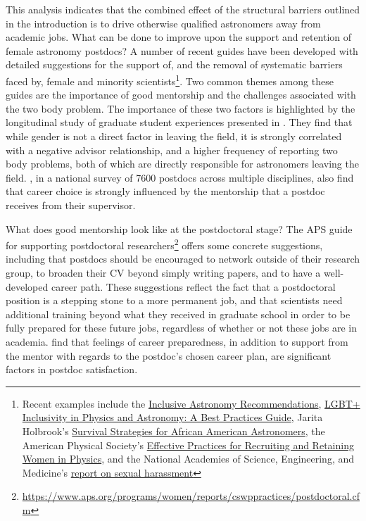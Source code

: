 \documentclass[modern]{aastex62}
\begin{document}
This analysis indicates that the combined effect of the structural barriers outlined in the introduction is to drive otherwise qualified astronomers away from academic jobs. What can be done to improve upon the support and retention of female astronomy postdocs? A number of recent guides have been developed with detailed suggestions for the support of, and the removal of systematic barriers faced by, female and minority scientists\footnote{Recent examples include the \href{https://tiki.aas.org/tiki-index.php?page=Inclusive_Astronomy_The_Nashville_Recommendations}{Inclusive Astronomy Recommendations},  \href{https://arxiv.org/abs/1804.08406}{LGBT+ Inclusivity in Physics and Astronomy: A Best Practices Guide}, Jarita Holbrook's \href{https://arxiv.org/abs/1204.0247}{Survival Strategies for African American Astronomers}, the American Physical Society's \href{https://www.aps.org/programs/women/reports/cswppractices/index.cfm}{Effective Practices for Recruiting and Retaining Women in Physics}, and the National Academies of Science, Engineering, and Medicine's \href{https://doi.org/10.17226/24994}{report on sexual harassment}}. Two common themes among these guides are the importance of good mentorship and the challenges associated with the two body problem. The importance of these two factors is highlighted by the longitudinal study of graduate student experiences presented in \citet{ivi16}. They find that while gender is not a direct factor in leaving the field, it is strongly correlated with a negative advisor relationship, and a higher frequency of reporting two body problems, both of which are directly responsible for astronomers leaving the field. \citet{mcc18}, in a national survey of 7600 postdocs across multiple disciplines, also find that career choice is strongly influenced by the mentorship that a postdoc receives from their supervisor. 

What does good mentorship look like at the postdoctoral stage? The APS guide for supporting postdoctoral researchers\footnote{\url{https://www.aps.org/programs/women/reports/cswppractices/postdoctoral.cfm}} offers some concrete suggestions, including that postdocs should be encouraged to network outside of their research group, to broaden their CV beyond simply writing papers, and to have a well-developed career path. These suggestions reflect the fact that a postdoctoral position is a stepping stone to a more permanent job, and that scientists need additional training beyond what they received in graduate school in order to be fully prepared for these future jobs, regardless of whether or not these jobs are in academia. \citet{mcc18} find that feelings of career preparedness, in addition to support from the mentor with regards to the postdoc's chosen career plan, are significant factors in postdoc satisfaction. 
\end{document}
